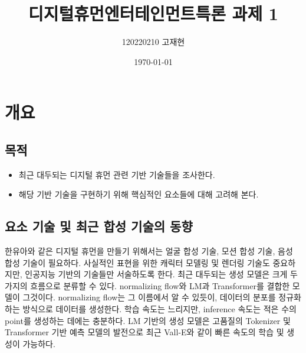 \documentclass[
	10pt,
	a4paper,
	figtabcapt,
]{oblivoir}
\title{\vspace{-4cm}디지털휴먼엔터테인먼트특론 과제 1}
\author{120220210 고재현}
\date{\today}
\begin{document}


\maketitle





\setcounter{table}{0}		                    %
\setcounter{figure}{0}		                    %




\section{개요}{\label{sec:intro}}

\subsection{목적}
\begin{itemize}\tightlist
    \item 최근 대두되는 디지털 휴먼 관련 기반 기술들을 조사한다.
    \item 해당 기반 기술을 구현하기 위해 핵심적인 요소들에 대해 고려해 본다.
\end{itemize}

\subsection{요소 기술 및 최근 합성 기술의 동향}
한유아와 같은 디지털 휴먼을 만들기 위해서는 얼굴 합성 기술, 모션 합성 기술, 음성 합성 기술이 필요하다.
사실적인 표현을 위한 캐릭터 모델링 및 렌더링 기술도 중요하지만, 인공지능 기반의 기술들만 서술하도록 한다.
최근 대두되는 생성 모델은 크게 두 가지의 흐름으로 분류할 수 있다.
normalizing flow와 LM과 Transformer를 결합한 모델이 그것이다.
normalizing flow는 그 이름에서 알 수 있듯이, 데이터의 분포를 정규화하는 방식으로 데이터를 생성한다.
학습 속도는 느리지만, inference 속도는 적은 수의 point를 생성하는 데에는 충분하다\cite{TFGMT2022}.
LM 기반의 생성 모델은 고품질의 Tokenizer 및 Transformer 기반 예측 모델의 발전으로
최근 Vall-E\cite{vall-eX}와 같이 빠른 속도의 학습 및 생성이 가능하다.
\end{document}
